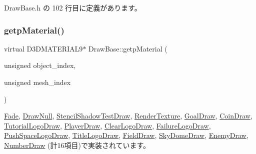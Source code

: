  Draw\+Base.\+h の 102 行目に定義があります。

\mbox{\label{class_draw_base_a940543b482e934624637f3c6b4d17f96}} 
\subsubsection{\texorpdfstring{getp\+Material()}{getpMaterial()}}
{\footnotesize\ttfamily virtual D3\+D\+M\+A\+T\+E\+R\+I\+A\+L9$\ast$ Draw\+Base\+::getp\+Material (\begin{DoxyParamCaption}\item[{unsigned}]{object\+\_\+index,  }\item[{unsigned}]{mesh\+\_\+index }\end{DoxyParamCaption})\hspace{0.3cm}{\ttfamily [pure virtual]}}



\mbox{\hyperlink{class_fade_a69db8b97a493082644fbd82c9ef3d1aa}{Fade}}, \mbox{\hyperlink{class_draw_null_aa07d7e89e723b68ec257da0f63d43f70}{Draw\+Null}}, \mbox{\hyperlink{class_stencil_shadow_test_draw_aacdc680646f832451ea575f1da1eec9a}{Stencil\+Shadow\+Test\+Draw}}, \mbox{\hyperlink{class_render_texture_a1defe8bfacccf91dc7479a977e70578c}{Render\+Texture}}, \mbox{\hyperlink{class_goal_draw_ae7f45a84006809475aba8d9ce1b1f8a5}{Goal\+Draw}}, \mbox{\hyperlink{class_coin_draw_ad62dd6a9dd468342849a0c6ad5f8a5dd}{Coin\+Draw}}, \mbox{\hyperlink{class_tutorial_logo_draw_acbd9aefdbd4450188e561fb5e5dcd64f}{Tutorial\+Logo\+Draw}}, \mbox{\hyperlink{class_player_draw_acb94ea7611a99698507321e44b7e9acb}{Player\+Draw}}, \mbox{\hyperlink{class_clear_logo_draw_a6273330249f20ddcde3a2ab97c1bdca2}{Clear\+Logo\+Draw}}, \mbox{\hyperlink{class_failure_logo_draw_a60b0cd983365acdad363cdaf8ebdef46}{Failure\+Logo\+Draw}}, \mbox{\hyperlink{class_push_space_logo_draw_a4dc41e6b1afece431f3c321145abe541}{Push\+Space\+Logo\+Draw}}, \mbox{\hyperlink{class_title_logo_draw_aafb35175c0ffe60c7a3facf7f9cda2f2}{Title\+Logo\+Draw}}, \mbox{\hyperlink{class_field_draw_a5ed29c14e0013513d72f79f8651db805}{Field\+Draw}}, \mbox{\hyperlink{class_sky_dome_draw_a45d3e8d70753af83c84c7a7c9193459f}{Sky\+Dome\+Draw}}, \mbox{\hyperlink{class_enemy_draw_a3f2885da84533364daaaac4a801fbc46}{Enemy\+Draw}}, \mbox{\hyperlink{class_number_draw_a4e1a672907ee288fc0c2c6caecdf3904}{Number\+Draw}} (計16項目)で実装されています。


